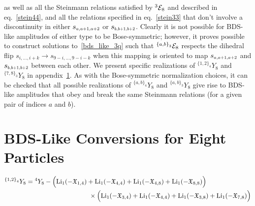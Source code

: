 \documentclass[11pt]{article}
\def\mand#1{\scaleto{s}{4.6pt}_{\scaleto{#1}{5.2pt}}}
\def\EthreeJ{{}^{{\{a,b\}}_3} {\cal E}_8}
\def\LiOneCalX#1#2{\text{Li}_1(-\mathfrak{X}_{#1,#2})}
\begin{document}
as well as all the Steinmann relations satisfied by ${}^3 {\cal E}_8$ and described in eq.~\eqref{stein44}, and all the relations specified in eq.~\eqref{stein33} that don't involve a discontinuity in either $\mand{a,a+1,a+2}$ or $\mand{b,b+1,b+2}$. Clearly it is not possible for BDS-like amplitudes of either type to be Bose-symmetric; however, it proves possible to construct solutions to~\eqref{bds_like_3q} such that $\EthreeJ$ respects the dihedral flip $s_{i,\dots,i+k} \rightarrow s_{9-i,\dots,9-i-k}$ when this mapping is oriented to map $\mand{a,a+1,a+2}$ and $\mand{b,b+1,b+2}$ between each other. We present specific realizations of ${}^{{\{1,2\}}_4} Y_{8}$ and ${}^{{\{7,8\}}_3} Y_{8}$ in appendix~\ref{appendix:bds_like}. As with the Bose-symmetric normalization choices, it can be checked that all possible realizations of ${}^{{\{a,b\}}_4} Y_{8}$ and ${}^{{\{a,b\}}_3} Y_{8}$ give rise to BDS-like amplitudes that obey and break the same Steinmann relations (for a given pair of indices $a$ and $b$). 



\section{BDS-Like Conversions for Eight Particles} \label{appendix:bds_like}

 \begin{align}
{}^{{\{1,2\}}_4} Y_{8} &= {}^{4}Y_8 -
\Big( \LiOneCalX{1}{4} + \LiOneCalX{4}{4} + \LiOneCalX{4}{8} + \LiOneCalX{8}{8} \Big)  \\
&\hspace{3.4cm} \times \Big( \LiOneCalX{3}{4}+ \LiOneCalX{4}{4} + \LiOneCalX{3}{8} + \LiOneCalX{7}{8} \Big) \nonumber
\end{align}
\end{document}
